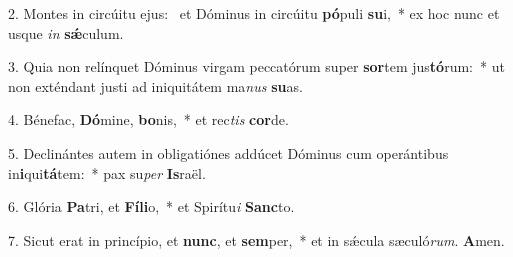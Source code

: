 2. Montes in circúitu ejus: \dag\  et Dóminus in circúitu \textbf{pó}puli \textbf{su}i,~*  ex hoc nunc et usque \textit{in} \textbf{sǽ}culum.\

3. Quia non relínquet Dóminus virgam peccatórum super \textbf{sor}tem jus\textbf{tó}rum:~*  ut non exténdant justi ad iniquitátem ma\textit{nus} \textbf{su}as.\

4. Bénefac, \textbf{Dó}mine, \textbf{bo}nis,~*  et rec\textit{tis} \textbf{cor}de.\

5. Declinántes autem in obligatiónes addúcet Dóminus cum operántibus in\textbf{i}qui\textbf{tá}tem:~*  pax su\textit{per} \textbf{Is}raël.\

6. Glória \textbf{Pa}tri, et \textbf{Fí}\textbf{li}o,~*  et Spirítu\textit{i} \textbf{Sanc}to.\

7. Sicut erat in princípio, et \textbf{nunc}, et \textbf{sem}per,~*  et in sǽcula sæculó\textit{rum}. \textbf{A}men.\

